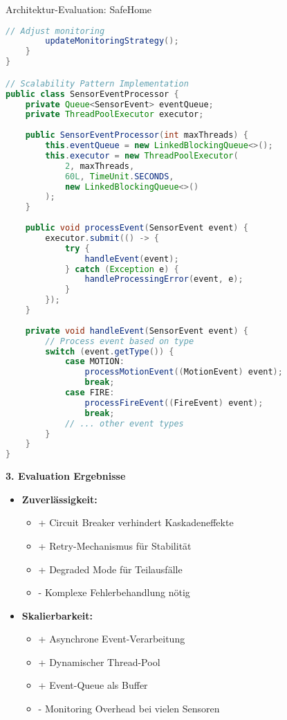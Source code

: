 \begin{example2}{Architektur-Evaluation: SafeHome}
\begin{lstlisting}[language=Java, style=basesmol]
        // Adjust monitoring
        updateMonitoringStrategy();
    }
}

// Scalability Pattern Implementation
public class SensorEventProcessor {
    private Queue<SensorEvent> eventQueue;
    private ThreadPoolExecutor executor;
    
    public SensorEventProcessor(int maxThreads) {
        this.eventQueue = new LinkedBlockingQueue<>();
        this.executor = new ThreadPoolExecutor(
            2, maxThreads,
            60L, TimeUnit.SECONDS,
            new LinkedBlockingQueue<>()
        );
    }
    
    public void processEvent(SensorEvent event) {
        executor.submit(() -> {
            try {
                handleEvent(event);
            } catch (Exception e) {
                handleProcessingError(event, e);
            }
        });
    }
    
    private void handleEvent(SensorEvent event) {
        // Process event based on type
        switch (event.getType()) {
            case MOTION:
                processMotionEvent((MotionEvent) event);
                break;
            case FIRE:
                processFireEvent((FireEvent) event);
                break;
            // ... other event types
        }
    }
}

\end{lstlisting}

\textbf{3. Evaluation Ergebnisse}
\begin{itemize}
    \item \textbf{Zuverlässigkeit:}
    \begin{itemize}
        \item + Circuit Breaker verhindert Kaskadeneffekte
        \item + Retry-Mechanismus für Stabilität
        \item + Degraded Mode für Teilausfälle
        \item - Komplexe Fehlerbehandlung nötig
    \end{itemize}
    
    \item \textbf{Skalierbarkeit:}
    \begin{itemize}
        \item + Asynchrone Event-Verarbeitung
        \item + Dynamischer Thread-Pool
        \item + Event-Queue als Buffer
        \item - Monitoring Overhead bei vielen Sensoren
    \end{itemize}
\end{itemize}
\end{example2}

